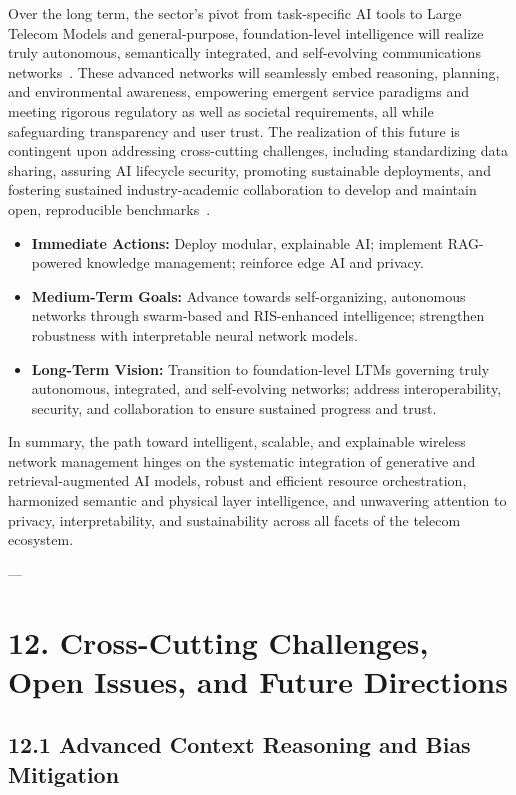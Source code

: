 \documentclass[11pt]{article}
\begin{document}
Over the long term, the sector's pivot from task-specific AI tools to Large Telecom Models and general-purpose, foundation-level intelligence will realize truly autonomous, semantically integrated, and self-evolving communications networks~\cite{ref16,ref20,ref46,ref49}. These advanced networks will seamlessly embed reasoning, planning, and environmental awareness, empowering emergent service paradigms and meeting rigorous regulatory as well as societal requirements, all while safeguarding transparency and user trust. The realization of this future is contingent upon addressing cross-cutting challenges, including standardizing data sharing, assuring AI lifecycle security, promoting sustainable deployments, and fostering sustained industry-academic collaboration to develop and maintain open, reproducible benchmarks~\cite{ref16,ref46,ref49}.

\begin{itemize}
    \item \textbf{Immediate Actions:} Deploy modular, explainable AI; implement RAG-powered knowledge management; reinforce edge AI and privacy.
    \item \textbf{Medium-Term Goals:} Advance towards self-organizing, autonomous networks through swarm-based and RIS-enhanced intelligence; strengthen robustness with interpretable neural network models.
    \item \textbf{Long-Term Vision:} Transition to foundation-level LTMs governing truly autonomous, integrated, and self-evolving networks; address interoperability, security, and collaboration to ensure sustained progress and trust.
\end{itemize}

In summary, the path toward intelligent, scalable, and explainable wireless network management hinges on the systematic integration of generative and retrieval-augmented AI models, robust and efficient resource orchestration, harmonized semantic and physical layer intelligence, and unwavering attention to privacy, interpretability, and sustainability across all facets of the telecom ecosystem.

---
\section{12. Cross-Cutting Challenges, Open Issues, and Future Directions}

\subsection{12.1 Advanced Context Reasoning and Bias Mitigation}
\end{document}
